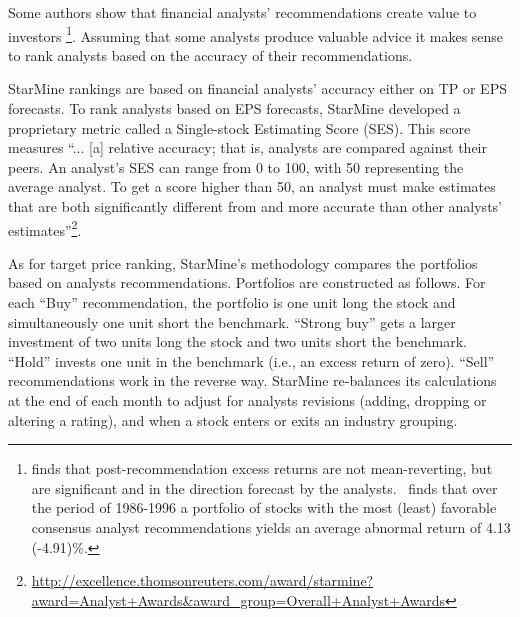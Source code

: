 \documentclass[a4paper,12pt,openright,notitlepage]{report}\usepackage[]{graphicx}\usepackage[]{color}
\begin{document}


Some authors show that financial analysts' recommendations create value to investors \citep{womack1996,barber2001}\footnote{\cite{womack1996} finds that  post-recommendation excess returns are not mean-reverting, but are significant and in the direction forecast by the analysts.~\cite{barber2001} finds that over the period of 1986-1996 a portfolio of stocks with the most (least) favorable consensus analyst recommendations yields an average abnormal return of 4.13 (-4.91)\%.}. Assuming that some analysts produce valuable advice it makes sense to rank analysts based on the accuracy of their recommendations.

StarMine rankings are based on financial analysts' accuracy either on TP or EPS forecasts. To rank analysts based on EPS forecasts, StarMine developed a proprietary metric called a Single-stock Estimating Score (SES). This score measures ``... [a] relative accuracy; that is, analysts are compared against their peers. An analyst's SES can range from 0 to 100, with 50 representing the average analyst. To get a score higher than 50, an analyst must make estimates that are both significantly different from and more accurate than other analysts' estimates''\footnote{\url{http://excellence.thomsonreuters.com/award/starmine?award=Analyst+Awards&award_group=Overall+Analyst+Awards}}.


As for target price ranking, StarMine's methodology compares the portfolios based on analysts recommendations. Portfolios are constructed as follows. For each ``Buy'' recommendation, the portfolio is one unit long the stock and simultaneously one unit short the benchmark. ``Strong buy'' gets a larger investment of two units long the stock and two units short the benchmark. ``Hold'' invests one unit in the benchmark (i.e., an excess return of zero). ``Sell'' recommendations work in the reverse way. StarMine re-balances its calculations at the end of each month to adjust for analysts revisions (adding, dropping or altering a rating), and when a stock enters or exits an industry grouping.
\end{document}

